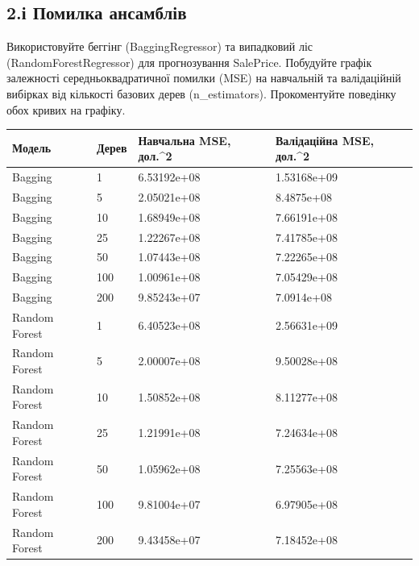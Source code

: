\Needspace{497pt}

\subsection{2.і Помилка ансамблів}

\begin{taskstatement}Використовуйте беггінг (BaggingRegressor) та випадковий ліс
(RandomForestRegressor) для прогнозування SalePrice. Побудуйте графік
залежності середньоквадратичної помилки (MSE) на навчальній та
валідаційній вибірках від кількості базових дерев (n\_estimators).
Прокоментуйте поведінку обох кривих на графіку.
\end{taskstatement}


\Needspace{19.2pt}


\Needspace{212pt}
\begingroup\fontsize{7.5}{9.5}\selectfont\setlength{\tabcolsep}{2.5mm}\renewcommand{\arraystretch}{1.12}\par\noindent\begin{tabular}{|llll|}
\hline
Модель & Дерев & Навчальна MSE, дол.\textasciicircum{}2 & Валідаційна MSE, дол.\textasciicircum{}2 \\
\hline
Bagging & 1 & 6.53192e+08 & 1.53168e+09 \\
Bagging & 5 & 2.05021e+08 & 8.4875e+08 \\
Bagging & 10 & 1.68949e+08 & 7.66191e+08 \\
Bagging & 25 & 1.22267e+08 & 7.41785e+08 \\
Bagging & 50 & 1.07443e+08 & 7.22265e+08 \\
Bagging & 100 & 1.00961e+08 & 7.05429e+08 \\
Bagging & 200 & 9.85243e+07 & 7.0914e+08 \\
Random Forest & 1 & 6.40523e+08 & 2.56631e+09 \\
Random Forest & 5 & 2.00007e+08 & 9.50028e+08 \\
Random Forest & 10 & 1.50852e+08 & 8.11277e+08 \\
Random Forest & 25 & 1.21991e+08 & 7.24634e+08 \\
Random Forest & 50 & 1.05962e+08 & 7.25563e+08 \\
Random Forest & 100 & 9.81004e+07 & 6.97905e+08 \\
Random Forest & 200 & 9.43458e+07 & 7.18452e+08 \\
\hline
\end{tabular}
\par\endgroup


